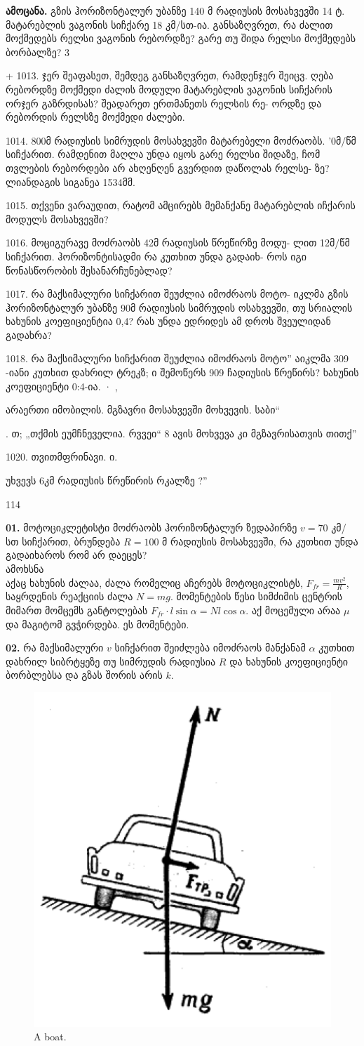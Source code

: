\documentclass[a4paper]{book}
\begin{document}
\textbf{ამოცანა.} გზის ჰორიზონტალურ უბანზე 140 მ რადიუსის მოსახვევში 14 ტ. მატარებლის ვაგონის სიჩქარე 18 კმ/სთ-ია. განსაზღვრეთ, რა ძალით მოქმედებს რელსი ვაგონის რებორდზე? გარე თუ შიდა რელსი მოქმედებს ბორბალზე? 3

+ 1013. ჯერ შეაფასეთ, შემდეგ განსაზღვრეთ, რამდენჯერ შეიცვ.
ღება რებორდზე მოქმედი ძალის მოდული მატარებლის ვაგონის
სიჩქარის ორჯერ გაზრდისას? შეადარეთ ერთმანეთს რელსის რე-
ორდზე და რებორდის რელსზე მოქმედი ძალები.

1014. 800მ რადიუსის სიმრუდის მოსახვევში მატარებელი მოძრაობს.
'0მ/წმ სიჩქარით. რამდენით მაღლა უნდა იყოს გარე რელსი შიდაზე,
ჩომ თვლების რებორდები არ ახღენღენ გვერდით დაწოლას რელსე-
ზე? ლიანდაგის სიგანეა 1534მმ.

1015. თქვენი ვარაუდით, რატომ ამცირებს მემანქანე მატარებლის
იჩქარის მოდულს მოსახვევში?

1016. მოციგურავე მოძრაობს 42მ რადიუსის წრეწირზე მოდუ-
ლით 12მ/წმ სიჩქარით. ჰორიზონტისადმი რა კუთხით უნდა გადაიხ-
როს იგი წონასწორობის შესანარჩუნებლად?

1017. რა მაქსიმალური სიჩქარით შეუძლია იმოძრაოს მოტო-
იკლმა გზის ჰორიზონტალურ უბანზე 90მ რადიუსის სიმრუდის
ოსახვევში, თუ სრიალის ხახუნის კოეფიციენტია 0,4? რას უნდა
ედრიდეს ამ დროს შვეულიდან გადახრა?

1018. რა მაქსიმალური სიჩქარით შეუძლია იმოძრაოს მოტო”
აიკლმა 309 -იანი კუთხით დახრილ ტრეკზ; ი შემოწერს 909
ჩადიუსის წრეწირს? ხახუნის კოეფიციენტი  0:4-ია.  · ,

არაერთი იმობილის. მგზავრი მოსახვევში მოხვევის. საბი“

. თ; „თქმის
ეუმჩნეველია. რვვეი“ 8 ავის მოხვევა კი მგზავრისათვის თითქ”

1020. თვითმფრინავი. ი.

უხვევს 6კმ რადიუსის წრეწირის რკალზე ?''

114


	 \textbf{01.} მოტოციკლეტისტი მოძრაობს ჰორიზონტალურ ზედაპირზე $v = 70$ კმ/სთ სიჩქარით, ბრუნდება $R = 100$ მ რადიუსის მოსახვევში, რა კუთხით უნდა გადაიხაროს რომ არ დაეცეს? \\
	 ამოხსნა\\
	 აქაც ხახუნის ძალაა, ძალა რომელიც აჩერებს მოტოციკლისტს, $F_{fr} = \frac{m v^2}{R}$, საყრდენის რეაქციის ძალა $N = mg$. მომენტების წესი სიმძიმის ცენტრის მიმართ მომცემს განტოლებას $F_{fr}\cdot l \sin \alpha = N l \cos \alpha$. აქ მოცემული არაა $\mu$ და მაგიტომ გვჭირდება. ეს მომენტები.
	 
	\textbf{02.} რა მაქსიმალური $v$ სიჩქარით შეიძლება იმოძრაოს მანქანამ $\alpha$ კუთხით დახრილ სიბრტყეზე თუ სიმრუდის რადიუსია $R$ და ხახუნის კოეფიციენტი ბორბლებსა და გზას შორის არის $k$.
			\begin{figure}[H]
           \includegraphics[width=0.2\columnwidth]{figures/02}
           \caption{A boat.}
           \label{fig:02}
        \end{figure}
\end{document}
